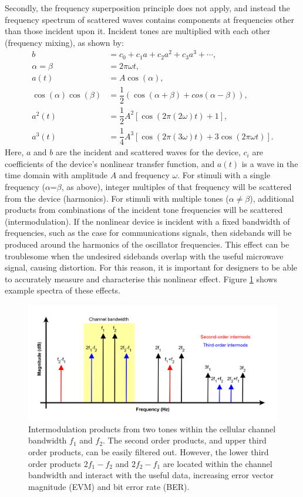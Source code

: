 \documentclass[../thesis/thesis.tex]{subfiles}
\begin{document}
Secondly, the frequency superposition principle does not apply, and instead the frequency spectrum of scattered waves contains components at frequencies other than those incident upon it. Incident tones are multiplied with each other (frequency mixing), as shown by:
\begin{align}
b&=c_0+c_1a+c_2a^2+c_3a^3+\cdots,\\
\alpha=\beta&=2\pi\omega t,\\
a(t)&=A\cos(\alpha),\\
\cos(\alpha)\cos(\beta)&=\dfrac{1}{2}(\cos(\alpha+\beta)+cos(\alpha-\beta)),\\
a^2(t)&=\dfrac{1}{2}A^2[\cos(2\pi(2\omega)t)+1],\\
a^3(t)&=\dfrac{1}{4}A^3[\cos(2\pi(3\omega)t)+3\cos(2\pi\omega t)].
\end{align}
Here, $a$ and $b$ are the incident and scattered waves for the device, $c_i$ are coefficients of the device's nonlinear transfer function, and $a(t)$ is a wave in the time domain with amplitude $A$ and frequency $\omega$. For stimuli with a single frequency ($\alpha$=$\beta$, as above), integer multiples of that frequency will be scattered from the device (harmonics). For stimuli with multiple tones ($\alpha\ne\beta$), additional products from combinations of the incident tone frequencies will be scattered (intermodulation). If the nonlinear device is incident with a fixed bandwidth of frequencies, such as the case for communications signals, then sidebands will be produced around the harmonics of the oscillator frequencies. This effect can be troublesome when the undesired sidebands overlap with the useful microwave signal, causing distortion. For this reason, it is important for designers to be able to accurately measure and characterise this nonlinear effect. Figure \ref{ch2_fig_im3} shows example spectra of these effects.

\begin{figure}
	\centering
	\includegraphics[width=\textwidth]{im3}
	\caption[Intermodulation products from two interacting tones.]{Intermodulation products from two tones within the cellular channel bandwidth $f_1$ and $f_2$. The second order products, and upper third order products, can be easily filtered out. However, the lower third order products $2f_1-f_2$ and $2f_2-f_1$ are located within the channel bandwidth and interact with the useful data, increasing error vector magnitude (EVM) and bit error rate (BER).}
	\label{ch2_fig_im3}
\end{figure}
\end{document}
